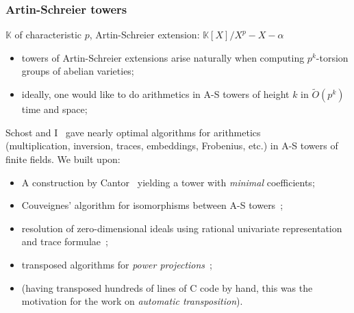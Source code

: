 \documentclass[10pt]{beamer}
\newcommand{\K}{\mathbb{K}}  %
\newcommand{\0}{\mathcal{O}}  %
\newcommand{\tildO}{\tilde{O}}  %
\begin{document}
\begin{frame}
  \frametitle{Artin-Schreier towers}
  
  $\K$ of characteristic $p$, Artin-Schreier extension:
  $\K[X]/X^p-X-\alpha$

  \begin{itemize}
  \item towers of Artin-Schreier extensions arise naturally when
    computing $p^k$-torsion groups of abelian varieties;
  \item ideally, one would like to do arithmetics in A-S towers of
    height $k$ in $\tildO(p^k)$ time and space;
  \end{itemize}

  Schost and I~\cite{df+schost09} gave nearly optimal algorithms for
  arithmetics\\ (multiplication, inversion, traces, embeddings,
  Frobenius, etc.) in A-S towers of finite fields. We built upon:
  \begin{itemize}
  \item A construction by Cantor~\cite{cantor89} yielding a tower with
    \emph{minimal} coefficients;
  \item Couveignes' algorithm for isomorphisms between A-S
    towers~\cite{couveignes00};
  \item resolution of zero-dimensional ideals using rational
    univariate representation and trace
    formulae~\cite{alonso+becker+roy+wormann,diaz+gonzalez01,rouiller99};
  \item transposed algorithms for \emph{power
      projections}~\cite{shoup94,shoup95,shoup99,bostan+salvy+schost03};
  \item (having transposed hundreds of lines of C code by hand, this
    was the motivation for the work on \emph{automatic
      transposition}).
  \end{itemize}
\end{frame}

\end{document}
